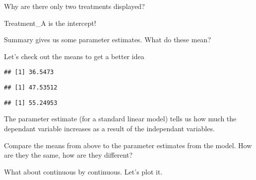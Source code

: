 \documentclass[
]{article}
\newenvironment{Shaded}{\begin{snugshade}}{\end{snugshade}}
\newcommand{\DecValTok}[1]{\textcolor[rgb]{0.00,0.00,0.81}{#1}}
\newcommand{\KeywordTok}[1]{\textcolor[rgb]{0.13,0.29,0.53}{\textbf{#1}}}
\newcommand{\NormalTok}[1]{#1}
\newcommand{\OperatorTok}[1]{\textcolor[rgb]{0.81,0.36,0.00}{\textbf{#1}}}
\newcommand{\StringTok}[1]{\textcolor[rgb]{0.31,0.60,0.02}{#1}}
\begin{document}
Why are there only two treatments displayed?

Treatment\_A is the intercept!

Summary gives us some parameter estimates. What do these mean?

Let's check out the means to get a better idea

\begin{Shaded}
\end{Shaded}

\begin{verbatim}
## [1] 36.5473
\end{verbatim}

\begin{Shaded}
\end{Shaded}

\begin{verbatim}
## [1] 47.53512
\end{verbatim}

\begin{Shaded}
\end{Shaded}

\begin{verbatim}
## [1] 55.24953
\end{verbatim}

The parameter estimate (for a standard linear model) tells us how much
the dependant variable increases as a result of the independant
variables.

Compare the means from above to the parameter estimates from the model.
How are they the same, how are they different?

What about continuous by continuous. Let's plot it.
\end{document}
